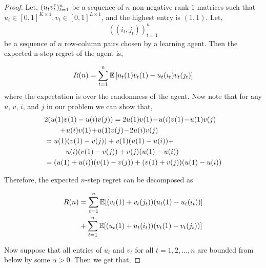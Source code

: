 \begin{proof}
Let, $(u_t v_t^\mathsf{\scriptscriptstyle T})_{t = 1}^n$ be a sequence of $n$ non-negative rank-$1$  matrices such that $u_t \in [0, 1]^{K \times 1}, v_t \in [0, 1]^{L \times 1}$, and the highest entry is $(1, 1)$. Let,
\begin{align*}
((i_t, j_t))_{t = 1}^n
\end{align*}
be a sequence of $n$ row-column pairs chosen by a learning agent. Then the expected n-step regret of the agent is,


\begin{align*}
R(n) = \sum_{t = 1}^n \mathbb{E} \left[{u_t(1) v_t(1) - u_t(i_t) v_t(j_t)}\right]
\end{align*}
where the expectation is over the randomness of the agent. Now note that for any $u$, $v$, $i$, and $j$ in our problem we can show that,
\begin{align*}
& 2 (u(1) v(1) - u(i) v(j)) =  2 u(1) v(1) \! - \! u(i) v(1) \! - \! u(1) v(j)\\
&  \hspace*{2em} + \! u(i) v(1) \! + \! u(1) v(j) \! - \! 2 u(i) v(j) \\
& = u(1) (v(1) - v(j))  + v(1) (u(1) -  u(i))  +\\
& \hspace*{3em}  u(i) (v(1)  - v(j))  + v(j) (u(1)  - u(i)) \\
& = (u(1) + u(i)) (v(1) - v(j)) + (v(1) + v(j)) (u(1) - u(i))
\end{align*}

Therefore, the expected $n$-step regret can be decomposed as

\begin{align*}
R(n) &= \sum_{t = 1}^n \mathbb{E}[{(v_t(1) + v_t(j_t)) (u_t(1) - u_t(i_t))}] \\
&+ \sum_{t = 1}^n \mathbb{E}[{(u_t(1) + u_t(i_t)) (v_t(1) - v_t(j_t))}]
\end{align*}

Now suppose that all entries of $u_t$ and $v_t$ for all $t=1,2,\ldots, n$ are bounded from below by some $\alpha > 0$. Then we get that,


\end{proof}

